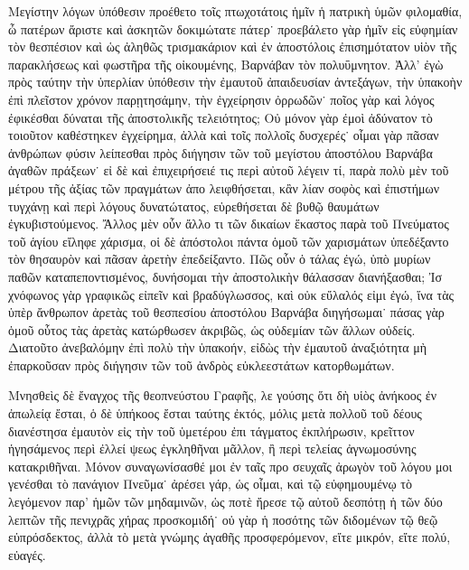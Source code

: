 



Μεγίστην λόγων ὑπόθεσιν προέθετο τοῖς πτωχοτάτοις
ἡμῖν ἡ πατρικὴ ὑμῶν φιλομαθία, ὦ πατέρων ἄριστε καὶ
ἀσκητῶν δοκιμώτατε πάτερ˙ προεβάλετο γὰρ ἡμῖν εἰς
εὐφημίαν τὸν θεσπέσιον καὶ ὡς ἀληθῶς τρισμακάριον
καὶ ἐν ἀποστόλοις ἐπισημότατον υἱὸν τῆς παρακλήσεως
καὶ φωστῆρα τῆς οἰκουμένης, Βαρνάβαν τὸν πολυΰμνητον.
Ἀλλ’ ἐγὼ πρὸς ταύτην τὴν ὑπερλίαν ὑπόθεσιν τὴν ἐμαυτοῦ
ἀπαιδευσίαν ἀντεξάγων, τὴν ὑπακοὴν ἐπὶ πλεῖστον χρόνον
παρῃτησάμην, τὴν ἐγχείρησιν ὀρρωδῶν˙ ποῖος γὰρ καὶ
λόγος ἐφικέσθαι δύναται τῆς ἀποστολικῆς τελειότητος;
Οὐ μόνον γὰρ ἐμοὶ ἀδύνατον τὸ τοιοῦτον καθέστηκεν
ἐγχείρημα, ἀλλὰ καὶ τοῖς πολλοῖς δυσχερές˙ οἶμαι γὰρ
πᾶσαν ἀνθρώπων φύσιν λείπεσθαι πρὸς διήγησιν τῶν
τοῦ μεγίστου ἀποστόλου Βαρνάβα ἀγαθῶν πράξεων˙ εἰ
δὲ καὶ ἐπιχειρήσειέ τις περὶ αὐτοῦ λέγειν τί, παρὰ
πολὺ μὲν τοῦ μέτρου τῆς ἀξίας τῶν πραγμάτων ἀπο%
λειφθήσεται, κἂν λίαν σοφὸς καὶ ἐπιστήμων τυγχάνῃ καὶ
περὶ λόγους δυνατώτατος, εὑρεθήσεται δὲ βυθῷ θαυμάτων
ἐγκυβιστούμενος. Ἄλλος μὲν οὖν ἄλλο τι τῶν δικαίων
ἕκαστος παρὰ τοῦ Πνεύματος τοῦ ἁγίου εἴληφε χάρισμα,
οἱ δὲ ἀπόστολοι πάντα ὁμοῦ τῶν χαρισμάτων ὑπεδέξαντο
τὸν θησαυρὸν καὶ πᾶσαν ἀρετὴν ἐπεδείξαντο. Πῶς οὖν
ὁ τάλας ἐγώ, ὑπὸ μυρίων παθῶν καταπεποντισμένος,
δυνήσομαι τὴν ἀποστολικὴν θάλασσαν διανήξασθαι; Ἰσ%
χνόφωνος γὰρ γραφικῶς εἰπεῖν καὶ βραδύγλωσσος, καὶ
οὐκ εὔλαλός εἰμι ἐγώ, ἵνα τὰς ὑπὲρ ἄνθρωπον ἀρετὰς
τοῦ θεσπεσίου ἀποστόλου Βαρνάβα διηγήσωμαι˙ πάσας
γὰρ ὁμοῦ οὗτος τὰς ἀρετὰς κατώρθωσεν ἀκριβῶς, ὡς
οὐδεμίαν τῶν ἄλλων οὐδείς. Διατοῦτο ἀνεβαλόμην ἐπὶ
πολὺ τὴν ὑπακοήν, εἰδὼς τὴν ἐμαυτοῦ ἀναξιότητα μὴ
ἐπαρκοῦσαν πρὸς διήγησιν τῶν τοῦ ἀνδρὸς εὐκλεεστάτων
κατορθωμάτων.

Μνησθεὶς δὲ ἔναγχος τῆς θεοπνεύστου Γραφῆς, λε%
γούσης ὅτι δὴ υἱὸς ἀνήκοος ἐν ἀπωλείᾳ ἔσται, ὁ δὲ
ὑπήκοος ἔσται ταύτης ἐκτός, μόλις μετὰ πολλοῦ τοῦ
δέους διανέστησα ἐμαυτὸν εἰς τὴν τοῦ ὑμετέρου ἐπι%
τάγματος ἐκπλήρωσιν, κρεῖττον ἡγησάμενος περὶ ἐλλεί%
ψεως ἐγκληθῆναι μᾶλλον, ἢ περὶ τελείας ἀγνωμοσύνης
κατακριθῆναι. Μόνον συναγωνίσασθέ μοι ἐν ταῖς προ%
σευχαῖς ἀρωγὸν τοῦ λόγου μοι γενέσθαι τὸ πανάγιον
Πνεῦμα˙ ἀρέσει γάρ, ὡς οἶμαι, καὶ τῷ εὐφημουμένῳ τὸ
λεγόμενον παρ’ ἡμῶν τῶν μηδαμινῶν, ὡς ποτὲ ἤρεσε
τῷ αὐτοῦ δεσπότῃ ἡ τῶν δύο λεπτῶν τῆς πενιχρᾶς
χήρας προσκομιδή˙ οὐ γὰρ ἡ ποσότης τῶν διδομένων
τῷ θεῷ εὐπρόσδεκτος, ἀλλὰ τὸ μετὰ γνώμης ἀγαθῆς
προσφερόμενον, εἴτε μικρόν, εἴτε πολύ, εὐαγές.

